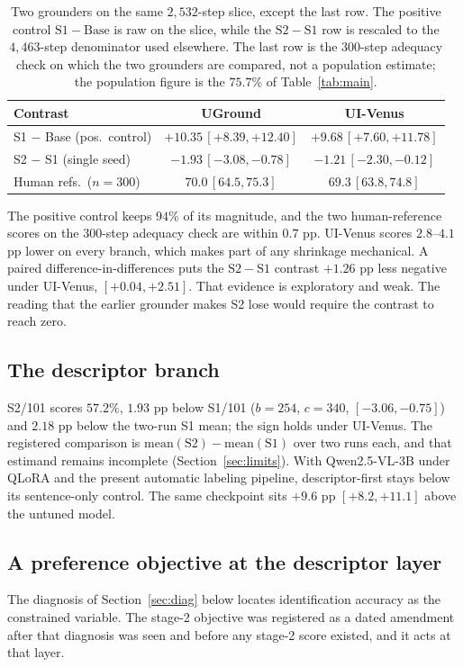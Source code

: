 \documentclass[conference]{IEEEtran}
\begin{document}
\begin{table}[!t]
\caption{Two grounders on the same $2{,}532$-step slice, except the last row. The positive
control $\mathrm{S1}-\mathrm{Base}$ is raw on the slice, while the $\mathrm{S2}-\mathrm{S1}$
row is rescaled to the $4{,}463$-step denominator used elsewhere. The last row is the
$300$-step adequacy check on which the two grounders are compared, not a population estimate;
the population figure is the $75.7\%$ of Table~\ref{tab:main}.}
\label{tab:venus}
\centering
\scriptsize
\setlength{\tabcolsep}{3.5pt}
\begin{tabular}{lcc}
\toprule
Contrast & UGround & UI-Venus \\
\midrule
S1 $-$ Base (pos.\ control) & $+10.35\,[+8.39, +12.40]$ & $+9.68\,[+7.60, +11.78]$ \\
S2 $-$ S1 (single seed) & $-1.93\,[-3.08, -0.78]$   & $-1.21\,[-2.30, -0.12]$ \\
\midrule
Human refs.\ ($n{=}300$) & $70.0\,[64.5, 75.3]$      & $69.3\,[63.8, 74.8]$ \\
\bottomrule
\end{tabular}
\end{table}

The positive control keeps $94\%$ of its magnitude, and the two human-reference scores on the $300$-step
adequacy check are within $0.7$ pp. UI-Venus scores $2.8$--$4.1$ pp lower on every branch, which makes part of
any shrinkage mechanical. A paired difference-in-differences puts the
$\mathrm{S2}-\mathrm{S1}$ contrast $+1.26$ pp less negative under UI-Venus,
$[+0.04, +2.51]$. That evidence is exploratory and weak. The reading that the earlier
grounder makes S2 lose would require the contrast to reach zero.

\subsection{The descriptor branch}
\label{sec:s2}
S2/101 scores $57.2\%$, $1.93$ pp below S1/101 ($b=254$, $c=340$, $[-3.06,-0.75]$) and
$2.18$ pp below the two-run S1 mean; the sign holds under UI-Venus. The registered
comparison is $\mathrm{mean}(\mathrm{S2}) - \mathrm{mean}(\mathrm{S1})$ over two runs each,
and that estimand remains incomplete (Section~\ref{sec:limits}). With Qwen2.5-VL-3B under
QLoRA and the present automatic labeling pipeline, descriptor-first stays below its
sentence-only control. The same checkpoint sits $+9.6$ pp $[+8.2, +11.1]$ above the untuned
model.

\subsection{A preference objective at the descriptor layer}
\label{sec:mindesc}
The diagnosis of Section~\ref{sec:diag} below locates identification accuracy as the
constrained variable. The stage-2 objective was registered as a dated amendment after that
diagnosis was seen and before any stage-2 score existed, and it acts at that layer.
\end{document}
